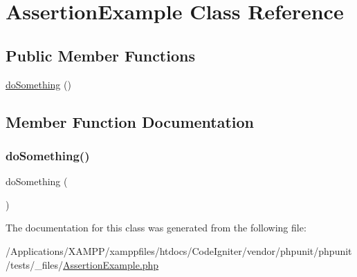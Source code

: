 \hypertarget{class_assertion_example}{}\section{Assertion\+Example Class Reference}
\label{class_assertion_example}
\subsection*{Public Member Functions}
\begin{DoxyCompactItemize}
\item 
\mbox{\hyperlink{class_assertion_example_abe91a8abe16159c0096d570ee6ccc985}{do\+Something}} ()
\end{DoxyCompactItemize}


\subsection{Member Function Documentation}
\mbox{\label{class_assertion_example_abe91a8abe16159c0096d570ee6ccc985}} 
\subsubsection{\texorpdfstring{do\+Something()}{doSomething()}}
{\footnotesize\ttfamily do\+Something (\begin{DoxyParamCaption}{ }\end{DoxyParamCaption})}



The documentation for this class was generated from the following file\+:\begin{DoxyCompactItemize}
\item 
/\+Applications/\+X\+A\+M\+P\+P/xamppfiles/htdocs/\+Code\+Igniter/vendor/phpunit/phpunit/tests/\+\_\+files/\mbox{\hyperlink{_assertion_example_8php}{Assertion\+Example.\+php}}\end{DoxyCompactItemize}
